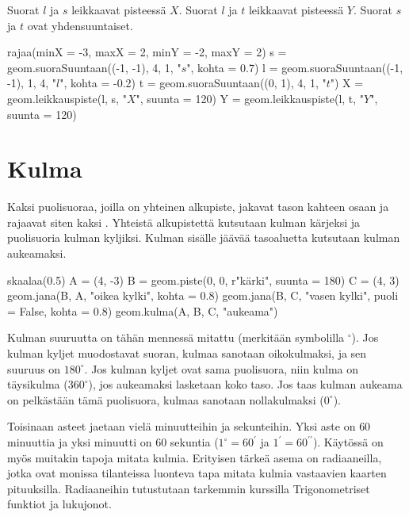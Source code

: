 \begin{esimerkki}
Suorat $l$ ja $s$ leikkaavat pisteessä $X$. Suorat $l$ ja $t$ leikkaavat pisteessä $Y$. Suorat $s$ ja $t$ ovat yhdensuuntaiset.

\begin{center}
\begin{kuva}
	rajaa(minX = -3, maxX = 2, minY = -2, maxY = 2)
	s = geom.suoraSuuntaan((-1, -1), 4, 1, "$s$", kohta = 0.7)
	l = geom.suoraSuuntaan((-1, -1), 1, 4, "$l$", kohta = -0.2)
	t = geom.suoraSuuntaan((0, 1), 4, 1, "$t$")
	X = geom.leikkauspiste(l, s, "$X$", suunta = 120)
	Y = geom.leikkauspiste(l, t, "$Y$", suunta = 120)
\end{kuva}
\end{center}
\end{esimerkki}


\section*{Kulma}

Kaksi puolisuoraa, joilla on yhteinen alkupiste, jakavat tason kahteen osaan ja rajaavat siten kaksi . Yhteistä alkupistettä
kutsutaan kulman kärjeksi ja puolisuoria kulman kyljiksi. Kulman sisälle jäävää tasoaluetta
kutsutaan kulman aukeamaksi.

\begin{center}
\begin{kuva}
	skaalaa(0.5)
	A = (4, -3)
	B = geom.piste(0, 0, r"k\"{a}rki", suunta = 180)
	C = (4, 3)
	geom.jana(B, A, "oikea kylki", kohta = 0.8)
	geom.jana(B, C, "vasen kylki", puoli = False, kohta = 0.8)
	geom.kulma(A, B, C, "aukeama")
\end{kuva}
\end{center}

Kulman suuruutta on tähän mennessä mitattu  (merkitään symbolilla $^{\circ}$). Jos kulman kyljet muodostavat suoran,
kulmaa sanotaan oikokulmaksi, ja sen suuruus on $180^{\circ}$.
Jos kulman kyljet ovat sama puolisuora, niin kulma on täysikulma ($360^{\circ}$), jos aukeamaksi lasketaan
koko taso. Jos taas kulman aukeama on pelkästään tämä puolisuora, kulmaa sanotaan
nollakulmaksi ($0^{\circ}$).

Toisinaan asteet jaetaan vielä minuutteihin ja sekunteihin. Yksi aste on $60$ minuuttia ja
yksi minuutti on $60$ sekuntia ($1^{\circ} = 60^{\prime}$ ja $1^{\prime} = 
60^{\prime \prime}$).
Käytössä on myös muitakin tapoja mitata kulmia. Erityisen tärkeä asema on radiaaneilla, jotka
ovat monissa tilanteissa luonteva tapa mitata kulmia vastaavien kaarten pituuksilla. Radiaaneihin
tutustutaan tarkemmin kurssilla Trigonometriset funktiot ja lukujonot.

